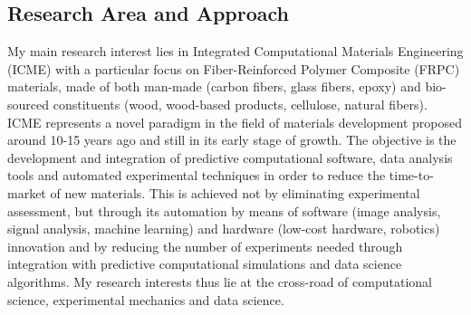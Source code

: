 \documentclass[
  a4paper, 
]{fortysecondscv}
\begin{document}
\makefrontsidebar

\subsection{Research Area and Approach}
My main research interest lies in Integrated Computational Materials Engineering (ICME) with a particular focus on Fiber-Reinforced Polymer Composite (FRPC) materials, made of both man-made (carbon fibers, glass fibers, epoxy) and bio-sourced constituents (wood, wood-based products, cellulose, natural fibers). ICME represents a novel paradigm in the field of materials development proposed around 10-15 years ago and still in its early stage of growth. The objective is the development and integration of predictive computational software, data analysis tools and automated experimental techniques in order to reduce the time-to-market of new materials. This is achieved not by eliminating experimental assessment, but through its automation by means of software (image analysis, signal analysis, machine learning) and hardware (low-cost hardware, robotics) innovation and by reducing the number of experiments needed through integration with predictive computational simulations and data science algorithms. My research interests thus lie at the cross-road of computational science, experimental mechanics and data science. 
\end{document}
